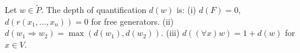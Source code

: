 Let $w \in \tilde{P}$. The depth of quantification $d(w)$ is: (i) $d(F)=0$, $d(r(x_1,\ldots,x_n))=0$ for free generators. (ii) $d(w_1 \Rightarrow w_2) = \max(d(w_1), d(w_2))$. (iii) $d((\forall x)w) = 1 + d(w)$ for $x \in V$.
